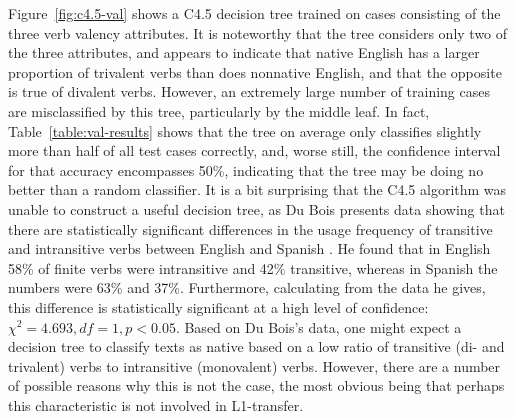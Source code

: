 \documentclass[main.tex]{subfiles}
\begin{document}

Figure~\ref{fig:c4.5-val} shows a C4.5 decision tree trained on cases consisting of the three verb valency attributes. It is noteworthy that the tree considers only two of the three attributes, and appears to indicate that native English has a larger proportion of trivalent verbs than does nonnative English, and that the opposite is true of divalent verbs. However, an extremely large number of training cases are misclassified by this tree, particularly by the middle leaf. In fact, Table~\ref{table:val-results} shows that the tree on average only classifies slightly more than half of all test cases correctly, and, worse still, the confidence interval for that accuracy encompasses 50\%, indicating that the tree may be doing no better than a random classifier. It is a bit surprising that the C4.5 algorithm was unable to construct a useful decision tree, as Du Bois presents data showing that there are statistically significant differences in the usage frequency of transitive and intransitive verbs between English and Spanish \citep[Table~2.3]{dubois:2003}. He found that in English 58\% of finite verbs were intransitive and 42\% transitive, whereas in Spanish the numbers were 63\% and 37\%. Furthermore, calculating from the data he gives, this difference is statistically significant at a high level of confidence: $\chi^2=4.693, df=1, p<0.05$. Based on Du Bois's data, one might expect a decision tree to classify texts as native based on a low ratio of transitive (di- and trivalent) verbs to intransitive (monovalent) verbs. However, there are a number of possible reasons why this is not the case, the most obvious being that perhaps this characteristic is not involved in L1-transfer.
\end{document}
